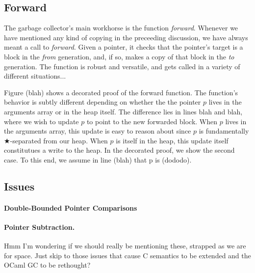 \subsection{Forward}
\label{sec:gcforward}
The garbage collector's main workhorse is the function \emph{forward}.
Whenever we have mentioned any kind of copying in the preceeding 
discussion, we have always meant a call to \emph{forward}. 
Given a pointer, it checks that the pointer's target is a block
in the \emph{from} generation, and, if so, 
makes a copy of that block in the \emph{to} generation. The function 
is robust and versatile, and gets called in a variety of different 
situations... 

Figure (blah) shows a decorated proof of the forward function.
The function's behavior is subtly different depending on 
whether the the pointer $p$ lives in the arguments array or in the 
heap itself. The difference lies in lines blah and blah, where 
we wish to update $p$ to point to the new forwarded block. 
When $p$ lives in the arguments array, this update is easy to 
reason about since $p$ is fundamentally $\bigstar$-separated from our heap. 
When $p$ is itself in the heap, this update itself constitutues a
write to the heap. In the decorated proof, we show the second 
case. To this end, we assume in line (blah) that p is (dododo). 



\subsection{Issues}
\label{sec:gccsemantics}
\paragraph{Double-Bounded Pointer Comparisons}
\paragraph{Pointer Subtraction.}
{\color{blue}Hmm I'm wondering if we should really be mentioning these,
strapped as we are for space. Just skip to those issues that cause C semantics to be 
extended and the OCaml GC to be rethought?}









